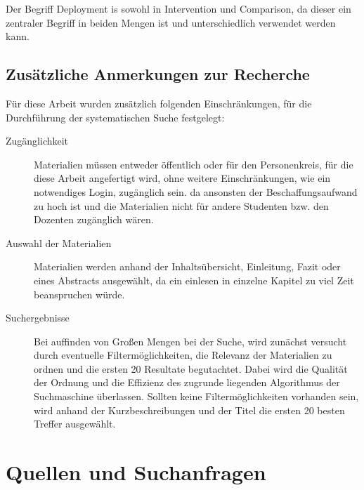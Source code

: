 \noindent
Der Begriff Deployment is sowohl in Intervention und Comparison, da dieser ein zentraler Begriff in beiden Mengen ist und unterschiedlich verwendet werden kann.

\subsection{Zusätzliche Anmerkungen zur Recherche}
\label{subsec:zusätzlicheAnmerkungenZurRecherce}
Für diese Arbeit wurden zusätzlich folgenden Einschränkungen, für die Durchführung der systematischen Suche festgelegt:

\begin{description}
	\item[Zugänglichkeit] Materialien müssen entweder öffentlich oder für den Personenkreis, für die diese Arbeit angefertigt wird, ohne weitere Einschränkungen, wie ein notwendiges Login, zugänglich sein. da ansonsten der Beschaffungsaufwand zu hoch ist und die Materialien nicht für andere Studenten bzw. den Dozenten zugänglich wären.
	\item[Auswahl der Materialien] Materialien werden anhand der Inhaltsübersicht, Einleitung, Fazit oder eines Abstracts ausgewählt, da ein einlesen in einzelne Kapitel zu viel Zeit beanspruchen würde.
	\item[Suchergebnisse] Bei auffinden von Großen Mengen bei der Suche, wird zunächst versucht durch eventuelle Filtermöglichkeiten, die Relevanz der Materialien zu ordnen und die ersten 20 Resultate begutachtet. Dabei wird die Qualität der Ordnung und die Effizienz des zugrunde liegenden Algorithmus der Suchmaschine überlassen. Sollten keine Filtermöglichkeiten vorhanden sein, wird anhand der Kurzbeschreibungen und der Titel die ersten 20 besten Treffer ausgewählt.
\end{description}

\section{Quellen und Suchanfragen}
\label{sec:QuellenUndSuchanfragen}

